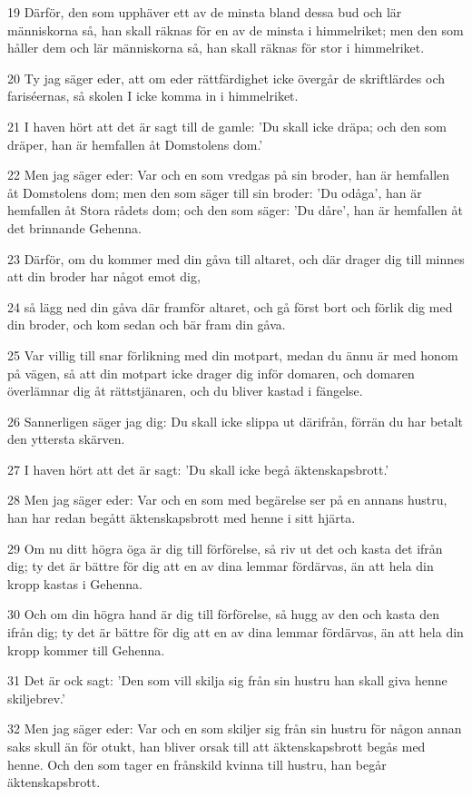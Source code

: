 \par 19 Därför, den som upphäver ett av de minsta bland dessa bud och lär människorna så, han skall räknas för en av de minsta i himmelriket; men den som håller dem och lär människorna så, han skall räknas för stor i himmelriket.
\par 20 Ty jag säger eder, att om eder rättfärdighet icke övergår de skriftlärdes och fariséernas, så skolen I icke komma in i himmelriket.
\par 21 I haven hört att det är sagt till de gamle: 'Du skall icke dräpa; och den som dräper, han är hemfallen åt Domstolens dom.'
\par 22 Men jag säger eder: Var och en som vredgas på sin broder, han är hemfallen åt Domstolens dom; men den som säger till sin broder: 'Du odåga', han är hemfallen åt Stora rådets dom; och den som säger: 'Du dåre', han är hemfallen åt det brinnande Gehenna.
\par 23 Därför, om du kommer med din gåva till altaret, och där drager dig till minnes att din broder har något emot dig,
\par 24 så lägg ned din gåva där framför altaret, och gå först bort och förlik dig med din broder, och kom sedan och bär fram din gåva.
\par 25 Var villig till snar förlikning med din motpart, medan du ännu är med honom på vägen, så att din motpart icke drager dig inför domaren, och domaren överlämnar dig åt rättstjänaren, och du bliver kastad i fängelse.
\par 26 Sannerligen säger jag dig: Du skall icke slippa ut därifrån, förrän du har betalt den yttersta skärven.
\par 27 I haven hört att det är sagt: 'Du skall icke begå äktenskapsbrott.'
\par 28 Men jag säger eder: Var och en som med begärelse ser på en annans hustru, han har redan begått äktenskapsbrott med henne i sitt hjärta.
\par 29 Om nu ditt högra öga är dig till förförelse, så riv ut det och kasta det ifrån dig; ty det är bättre för dig att en av dina lemmar fördärvas, än att hela din kropp kastas i Gehenna.
\par 30 Och om din högra hand är dig till förförelse, så hugg av den och kasta den ifrån dig; ty det är bättre för dig att en av dina lemmar fördärvas, än att hela din kropp kommer till Gehenna.
\par 31 Det är ock sagt: 'Den som vill skilja sig från sin hustru han skall giva henne skiljebrev.'
\par 32 Men jag säger eder: Var och en som skiljer sig från sin hustru för någon annan saks skull än för otukt, han bliver orsak till att äktenskapsbrott begås med henne. Och den som tager en frånskild kvinna till hustru, han begår äktenskapsbrott.
